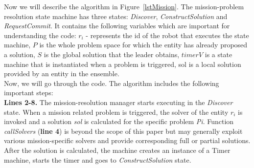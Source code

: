 \documentclass[journal]{IEEEtran}
\theoremstyle{definition}
\begin{document}
Now we will describe the algorithm in Figure~\ref{lstMission}. 
The mission-problem resolution state machine has three states: \textit{Discover}, \textit{ConstructSolution} and \textit{RequestCommit}. 
It contains the following variables which are important for understanding the code: 
$r_i$ - represents the id of the robot that executes the state machine, $P$ is the whole problem space for which the entity has already proposed a solution, $S$ is the global solution that the leader obtains, $timerV$ is a state machine that is instantiated when a problem is triggered, sol is a local solution provided by an entity in the ensemble. \\
Now, we will go through the code.
The algorithm includes the following important steps: \\
\textbf{Lines 2-8.} The mission-resolution manager starts executing in the \textit{Discover} state. When a mission related problem is triggered, the solver of the entity $r_i$ is invoked and a solution \textit{sol}
is calculated for the specific problem \textit{Pi}. Function \textit{callSolvers} (\textbf{line 4}) 
is beyond the scope of this paper but may generally exploit
various mission-specific solvers and provide corresponding full or partial solutions.  After the solution is calculated, the machine creates an instance of a Timer machine, starts the timer and goes to \textit{ConstructSolution} state.
\end{document}
